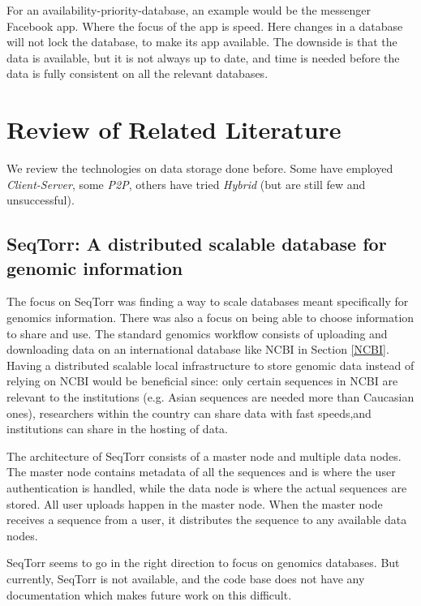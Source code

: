 \documentclass[acmsmall]{acmart}
\begin{document}
\begin{multicols}{2}
For an availability-priority-database, an example would be the messenger Facebook app. Where the focus of the app is speed. Here changes in a database will not lock the database, to make its app available. The downside is that the data is available, but it is not always up to date, and time is needed before the data is fully consistent on all the relevant databases.


\section{Review of Related Literature}

We review the technologies on data storage done before. Some have employed \textit{Client-Server}, some \textit{P2P}, others have tried \textit{Hybrid} (but are still few and unsuccessful).

\subsection{SeqTorr: A distributed scalable database for genomic information}
The focus on SeqTorr was finding a way to scale databases meant specifically for genomics information. There was also a focus on being able to choose information to share and use. The standard genomics workflow consists of uploading and downloading data on an international database like NCBI in Section \ref{NCBI}. Having a distributed scalable local infrastructure to store genomic data instead of relying on NCBI would be beneficial since: only certain sequences in NCBI are relevant to the institutions (e.g. Asian sequences are needed more than Caucasian ones), researchers within the country can share data with fast speeds,and institutions can share in the hosting of data.

The architecture of SeqTorr consists of a master node and multiple data nodes. The master node contains metadata of all the sequences and is where the user authentication is handled, while the data node is where the actual sequences are stored. All user uploads happen in the master node. When the master node receives a sequence from a user, it distributes the sequence to any available data nodes. 
\cite{seqtorr}

SeqTorr seems to go in the right direction to focus on genomics databases. But currently, SeqTorr is not available, and the code base does not have any documentation which makes future work on this difficult.


\end{multicols}
\end{document}
